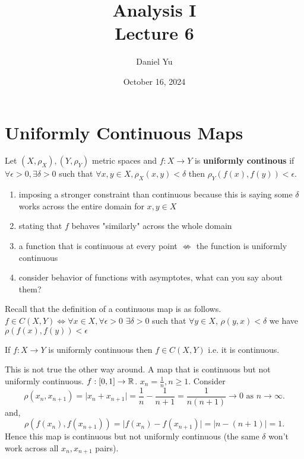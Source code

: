 \documentclass[a4paper]{article}
\title{\Huge{Analysis I}\\Lecture 6}
\author{\huge{Daniel Yu}}
\date{October 16, 2024}
\begin{document}
\maketitle
\newpage%
\tableofcontents
\pagebreak

\section{Uniformly Continuous Maps}

\begin{definition}
  Let $(X, \rho_X), (Y, \rho_Y)$ metric spaces and  $f:X \to Y$ is \textbf{uniformly continous} if $\forall \epsilon > 0, \exists \delta > 0$ such that $\forall x,y \in X, \rho_X(x,y) < \delta$ then  $\rho_{Y}(f(x), f(y)) < \epsilon$.  

  \begin{enumerate}
    \item imposing a stronger constraint than continuous because this is saying some $\delta$ works across the entire domain for  $x,y \in X$ 
    \item stating that  $f$ behaves "similarly" across the whole domain
    \item a function that is continuous at every point $\not\iff$ the function is uniformly continuous
    \item consider behavior of functions with asymptotes, what can you say about them?
  \end{enumerate}
\end{definition}

\begin{remark}
  Recall that the definition of a continuous map is as follows. $f \in C(X,Y) \iff \forall x \in X, \forall \epsilon > 0$ $\exists \delta > 0$ such that $\forall y \in X$, $\rho(y,x) < \delta$ we have $\rho (f(x),f(y)) < \epsilon$
\end{remark}

\begin{lemma}
  If $f:X \to Y$ is uniformly continuous then  $f \in C(X,Y)$ i.e. it is continuous.
\end{lemma}

\begin{note}
  This is not true the other way around. A map that is continuous but not uniformly continuous. $f : [0,1]  
  \to \mathbb{R}$. $x_n = \frac{1}{n}, n \geq 1$. Consider
  \[
    \rho(x_n, x_{n+1}) = \mid x_n + x_{n+1} \mid  = \frac{1}{n} - \frac{1}{n+1} = \frac{1}{n(n+1)} \to 0 \text{ as $n \to \infty$}
  .\] 
  and,
  \[
  \rho(f(x_n), f(x_{n+1})) = \mid f(x_n) - f(x_{n+1}) \mid  = \mid n-(n+1) \mid = 1
  .\] 
  Hence this map is continuous but not uniformly continuous (the same $\delta $ won't work across all $x_n, x_{n+1}$ pairs).   
\end{note}
\end{document}
